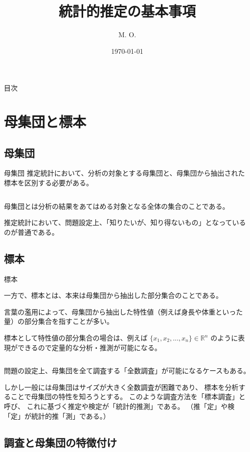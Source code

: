 \documentclass[dvipdfmx, autodetect-engine, aspectratio=169, 10.5pt]{beamer}
\title{統計的推定の基本事項}
\author{M. O.}
\date{\today}
\begin{document}
\begin{frame}[plain]
	\titlepage
\end{frame}

\begin{frame}{目次}
	\tableofcontents
\end{frame}

\section{母集団と標本}

\subsection{母集団}

\begin{frame}{母集団}
	推定統計において、分析の対象とする母集団と、母集団から抽出された標本を区別する必要がある。

	${}$

	母集団とは分析の結果をあてはめる対象となる全体の集合のことである。

	推定統計において、問題設定上、「知りたいが、知り得ないもの」となっているのが普通である。
\end{frame}

\subsection{標本}

\begin{frame}{標本}

	一方で、標本とは、本来は母集団から抽出した部分集合のことである。

	言葉の濫用によって、母集団から抽出した特性値（例えば身長や体重といった量）の部分集合を指すことが多い。

	標本として特性値の部分集合の場合は、例えば
	$\{ x_{1}, x_{2}, ..., x_{n} \} \in \mathbb{R}^{n}$
	のように表現ができるので定量的な分析・推測が可能になる。

	${}$

	問題の設定上、母集団を全て調査する「全数調査」が可能になるケースもある。

	しかし一般には母集団はサイズが大きく全数調査が困難であり、
	標本を分析することで母集団の特性を知ろうとする。
	このような調査方法を「標本調査」と呼び、
	これに基づく推定や検定が「統計的推測」である。
	（推「定」や検「定」が統計的推「測」である。）
\end{frame}

\subsection{調査と母集団の特徴付け}
\end{document}
